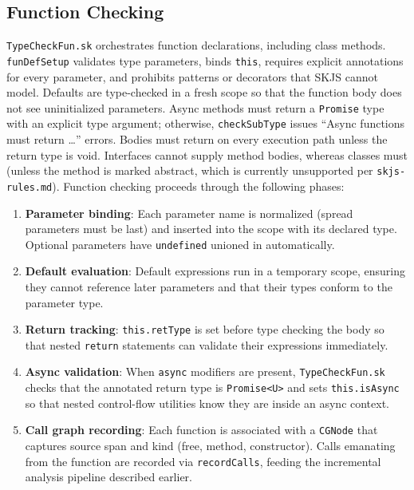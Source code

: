 \documentclass[11pt]{article}
\begin{document}
\subsection{Function Checking}
\texttt{TypeCheckFun.sk} orchestrates function declarations, including class methods. \texttt{funDefSetup} validates type parameters, binds \texttt{this}, requires explicit annotations for every parameter, and prohibits patterns or decorators that SKJS cannot model. Defaults are type-checked in a fresh scope so that the function body does not see uninitialized parameters. Async methods must return a \texttt{Promise} type with an explicit type argument; otherwise, \texttt{checkSubType} issues ``Async functions must return \ldots'' errors. Bodies must return on every execution path unless the return type is void. Interfaces cannot supply method bodies, whereas classes must (unless the method is marked abstract, which is currently unsupported per \texttt{skjs-rules.md}).
Function checking proceeds through the following phases:
\begin{enumerate}[leftmargin=*]
  \item \textbf{Parameter binding}: Each parameter name is normalized (spread parameters must be last) and inserted into the scope with its declared type. Optional parameters have \texttt{undefined} unioned in automatically.
  \item \textbf{Default evaluation}: Default expressions run in a temporary scope, ensuring they cannot reference later parameters and that their types conform to the parameter type.
  \item \textbf{Return tracking}: \texttt{this.retType} is set before type checking the body so that nested \texttt{return} statements can validate their expressions immediately.
  \item \textbf{Async validation}: When \texttt{async} modifiers are present, \texttt{TypeCheckFun.sk} checks that the annotated return type is \texttt{Promise<U>} and sets \texttt{this.isAsync} so that nested control-flow utilities know they are inside an async context.
  \item \textbf{Call graph recording}: Each function is associated with a \texttt{CGNode} that captures source span and kind (free, method, constructor). Calls emanating from the function are recorded via \texttt{recordCalls}, feeding the incremental analysis pipeline described earlier.
\end{enumerate}
\end{document}
